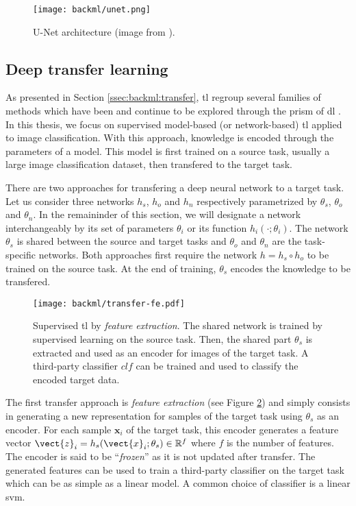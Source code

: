 \begin{figure}
  \centering
  \texttt{[image: backml/unet.png]}
  \caption{U-Net architecture (image from \parencite{ronneberger2015unet}).}
  \label{fig:backml:unet}
\end{figure}

\subsection{Deep transfer learning}
\label{ssec:backml:dl:deeptransfer}

As presented in Section \ref{ssec:backml:transfer}, \acrlong{tl} regroup several
families of methods which have been and continue to be explored through the prism
of \acrlong{dl} \parencite{tan2018survey}. In this thesis, we focus on supervised
model-based (or network-based) \acrlong{tl} applied to image classification. With
this approach, knowledge is encoded through the parameters of a model. This model
is first trained on a source task, usually a large image classification dataset,
then transfered to the target task.

There are two approaches for transfering a deep neural network to a target task.
Let us consider three networks $h_s$, $h_o$ and $h_n$ respectively parametrized
by $\theta_s$, $\theta_o$ and $\theta_n$. In the remaininder of this section, we
will designate a network interchangeably by its set of parameters $\theta_i$ or
its function $h_i(\cdot;\theta_i)$. The network $\theta_s$ is shared between the
source and target tasks and $\theta_o$ and $\theta_n$ are the task-specific
networks. Both approaches first require the network $h = h_s \circ h_o$ to be
trained on the source task. At the end of training, $\theta_s$ encodes the knowledge
to be transfered.

\begin{figure}
  \centering
  \texttt{[image: backml/transfer-fe.pdf]}
  \caption{Supervised \acrlong{tl} by \textit{feature extraction}. The shared network is trained by supervised learning on the source task. Then, the shared part $\theta_s$ is extracted and used as an encoder for images of the target task. A third-party classifier $clf$ can be trained and used to classify the encoded target data.}
  \label{fig:backml:transfer-fe}
\end{figure}

The first transfer approach is \textit{feature extraction} (see Figure
\ref{fig:backml:transfer-fe}) and simply consists in generating a new representation
for samples of the target task using $\theta_s$ as an encoder. For each sample
$\mathbf{x}_i$ of the target task, this encoder generates a feature vector
$\vect{z}_i = h_s(\vect{x}_i;\theta_s) \in \mathbb{R}^f$ where $f$ is the number
of features. The encoder is said to be ``\textit{frozen}'' as it is not updated
after transfer. The generated features can be used to train a third-party classifier
on the target task which can be as simple as a linear model. A common choice of
classifier is a linear \acrshort{svm}.

